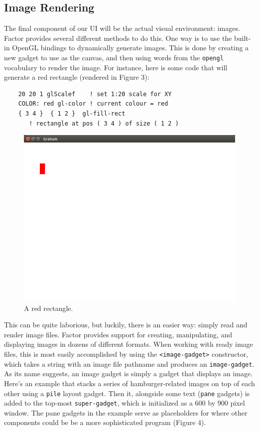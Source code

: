 \documentclass{sig-alternate}
\begin{document}
\subsection{Image Rendering}
The final component of our UI will be the actual visual environment: images. Factor provides several different methods to do this. One way is to use the built-in OpenGL bindings to dynamically generate images. This is done by creating a new gadget to use as the canvas, and then using words from the \texttt{opengl} vocabulary to render the image. For instance, here is some code that will generate a red rectangle (rendered in Figure 3):
\begin{verbatim}
    20 20 1 glScalef    ! set 1:20 scale for XY                
    COLOR: red gl-color ! current colour = red  
    { 3 4 }  { 1 2 }  gl-fill-rect  
       ! rectangle at pos ( 3 4 ) of size ( 1 2 )
\end{verbatim}


\begin{figure}[h!]
  \centering
    \includegraphics[scale=.3]{rectangle.jpg}
  \caption{A red rectangle.}
\end{figure}



This can be quite laborious, but luckily, there is an easier way: simply read and render image files. Factor provides support for creating, manipulating, and displaying images in dozens of different formats. When working with ready image files, this is most easily accomplished by using the \texttt{<image-gadget>} constructor, which takes a string with an image file pathname and produces an \texttt{image-gadget}. As its name suggests, an image gadget is simply a gadget that displays an image. Here's an example that stacks a series of hamburger-related images on top of each other using a \texttt{pile} layout gadget. Then it, alongside some text (\texttt{pane} gadgets) is added to the top-most \texttt{super-gadget}, which is initialized as a 600 by 900 pixel window. The pane gadgets in the example serve as placeholders for where other components could be be a more sophisticated program (Figure 4).
\end{document}
